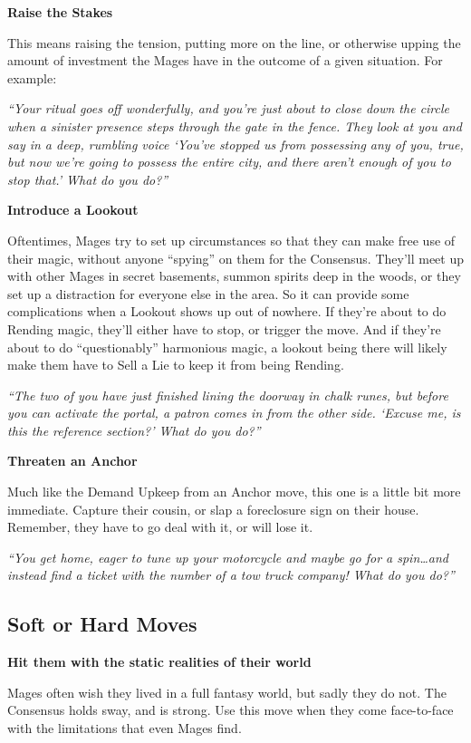 \documentclass[
  oneside,
  statementpaper,
  9pt]{memoir}
\begin{document}
\textbf{Raise the Stakes}

This means raising the tension, putting more on the line, or otherwise
upping the amount of investment the Mages have in the outcome of a given
situation. For example:

\emph{``Your ritual goes off wonderfully, and you're just about to close
down the circle when a sinister presence steps through the gate in the
fence. They look at you and say in a deep, rumbling voice `You've
stopped us from possessing any of you, true, but now we're going to
possess the entire city, and there aren't enough of you to stop that.'
What do you do?''}

\textbf{Introduce a Lookout}

Oftentimes, Mages try to set up circumstances so that they can make free
use of their magic, without anyone ``spying'' on them for the Consensus.
They'll meet up with other Mages in secret basements, summon spirits
deep in the woods, or they set up a distraction for everyone else in the
area. So it can provide some complications when a Lookout shows up out
of nowhere. If they're about to do Rending magic, they'll either have to
stop, or trigger the move. And if they're about to do ``questionably''
harmonious magic, a lookout being there will likely make them have to
Sell a Lie to keep it from being Rending.

\emph{``The two of you have just finished lining the doorway in chalk
runes, but before you can activate the portal, a patron comes in from
the other side. `Excuse me, is this the reference section?' What do you
do?''}

\textbf{Threaten an Anchor}

Much like the Demand Upkeep from an Anchor move, this one is a little
bit more immediate. Capture their cousin, or slap a foreclosure sign on
their house. Remember, they have to go deal with it, or will lose it.

\emph{``You get home, eager to tune up your motorcycle and maybe go for
a spin\ldots and instead find a ticket with the number of a tow truck
company! What do you do?''}

\hypertarget{soft-or-hard-moves}{%
\subsection{Soft or Hard Moves}\label{soft-or-hard-moves}}

\textbf{Hit them with the static realities of their world}

Mages often wish they lived in a full fantasy world, but sadly they do
not. The Consensus holds sway, and is strong. Use this move when they
come face-to-face with the limitations that even Mages find.
\end{document}
